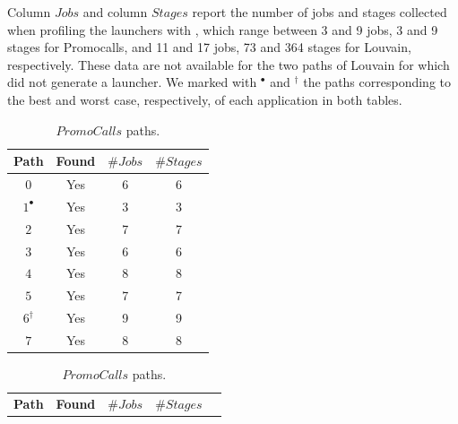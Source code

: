 Column $Jobs$ and column $Stages$ report  the number of jobs and stages collected when profiling the launchers with \cSpark, which range between 3 and 9 jobs, 3 and 9 stages for Promocalls, and 11 and 17 jobs, 73 and 364 stages for Louvain, respectively. These data are not available for the two paths of Louvain for which \dSymb did not generate a launcher.
We marked with $^\bullet$ and $^\dagger$ the paths corresponding to the best and worst case, respectively, of each application in both tables. 

\begin{table}[thbp]
	\centering
	\hspace{1cm}
	\parbox{.48\linewidth}{
		\begin{tabular}{c|c|c|c}
			\toprule
			\multicolumn{1}{c|}{\textbf{Path}} &  \multicolumn{1}{c|}{\textbf{Found}}   & \multicolumn{1}{c|}{\boldmath$\#Jobs$}  &  \multicolumn{1}{c}{\boldmath$\#Stages$}    \\
			\midrule
			$0$ & Yes  & 6 & 6  \\	
			$1^{\bullet}$ & Yes  &  3 &  3 \\	
			$2$ & Yes & 7  & 7 \\
			$3$ & Yes &  6 & 6 \\
			$4$ & Yes & 8  & 8  \\
			$5$ & Yes & 7 & 7 \\
			$6^{\dagger}$ & Yes & 9 & 9 \\
			$7$ & Yes &  8 & 8 \\
			\bottomrule
		\end{tabular}
		\caption{\boldmath$PromoCalls$ paths.}
		\label{Table:Check:Promo}
	}
	\centering
	\parbox{.48\linewidth}{
		\vspace{2cm}
		\hspace{0.5cm}
		\begin{tabular}{c|c|c|c|c}
			\toprule
			\multicolumn{1}{c|}{\textbf{Path}} &  \multicolumn{1}{c|}{\textbf{Found}}   & \multicolumn{1}{c|}{\boldmath$\#Jobs$}  &  \multicolumn{1}{c}{\boldmath$\#Stages$}    \\

\end{tabular}}
\end{table}
